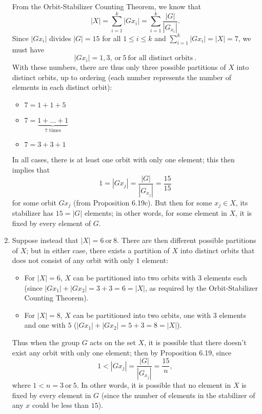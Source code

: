 \documentclass{homework}
\begin{document}
\begin{solution}
\begin{enumerate}[label=(\alph*)]
      From the Orbit-Stabilizer Counting Theorem, we know that \[
        \left|X\right|=\sum_{i=1}^{k} \left|Gx_i\right|=\sum_{i=1}^{k}
        \frac{\left|G\right|}{\left|G_{x_i}\right|}
      .\] Since $\left|Gx_i\right|$ divides $\left|G\right|=15$ for all $1\le i\le k$ and
      $\sum_{i=1}^{k} \left|Gx_i\right|=\left|X\right|=7$, we must have \[
        \left|Gx_i\right|=1,3,~\text{or}~5~\text{for all distinct orbits}~
      .\] With these numbers, there are thus only three possible partitions of $X$ into distinct
      orbits, up to ordering (each number represents the number of elements in each distinct orbit):
      \begin{itemize}
        \item $7=1+1+5$
        \item $7=\underbrace{1+\ldots+1}_\text{$7$ times}$
        \item $7=3+3+1$
      \end{itemize}
      In all cases, there is at least one orbit with only one element; this then implies that \[
        1=\left|Gx_j\right|=\frac{\left|G\right|}{\left|G_{x_j}\right|}=\frac{15}{15}
      \] for some orbit $Gx_j$ (from Proposition 6.19c). But then for some $x_j\in X$, its
      stabilizer has $15=\left|G\right|$ elements; in other words, for some element in $X$, it is
      fixed by every element of $G$.
    \item Suppose instead that $\left| X \right| =6~\text{or}~8$. There are then different possible
      partitions of $X$; but in either case, there exists a partition of $X$ into distinct orbits
      that does not consist of any orbit with only $1$ element:
      \begin{itemize}
        \item For $\left| X \right|=6 $, $X$ can be partitioned into two orbits with $3$ elements
          each (since $\left|Gx_1\right|+\left|Gx_2\right|=3+3=6=\left|X\right|$, as required by the
          Orbit-Stabilizer Counting Theorem).
        \item For $\left|X\right|=8$, $X$ can be partitioned into two orbits, one with $3$ elements
          and one with $5$ ($\left|Gx_1\right|+\left|Gx_2\right|=5+3=8=\left|X\right|$).
      \end{itemize}
      Thus when the group $G$ acts on the set $X$, it is possible that there doesn't exist any orbit
      with only one element; then by Proposition 6.19, since \[
        1<\left|Gx_j\right|=\frac{\left|G\right|}{\left|G_{x_j}\right|}=\frac{15}{n}
      ,\] where $1<n=3~\text{or}~5$. In other words, it is possible that no element in $X$ is fixed
      by every element in $G$ (since the number of elements in the stabilizer of any $x$ could be
      less than $15$).
  \end{enumerate}
\end{solution}
\end{document}
